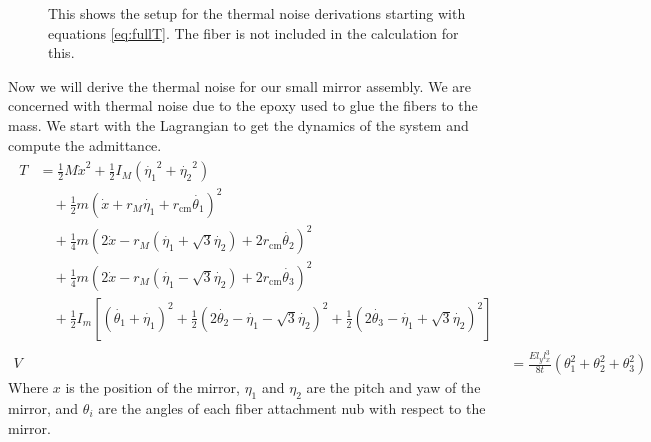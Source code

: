 \begin{figure}
\centering
  \caption[Sketch of Thermal Noise Calculation]{
    This shows the setup for the thermal noise derivations starting with
    equations \ref{eq:fullT}.
    The fiber is not included in the calculation for this.
    }
  \label{fig:tnoisesketch}
\end{figure}

Now we will derive the thermal noise for our small mirror assembly. We are
concerned with thermal noise due to the epoxy used to glue the fibers to the
mass. We start with the Lagrangian to get the dynamics of the system and
compute the admittance.
\begin{align}
\begin{split} \label{eq:fullT}
T &= \frac{1}{2} M \dot{x}^2 +
    \frac{1}{2}I_M \left( \dot{\eta_1}^2 + \dot{\eta_2}^2 \right) \\
    &\quad + \frac{1}{2} m \left(
    \dot{x} + r_M \dot{\eta_1}
    + r_{\mathrm{cm}} \dot{\theta_1} \right)^2 \\
    &\quad + \frac{1}{4} m \left(
    2 \dot{x} - r_M \left(
    \dot{\eta_1}
    + \sqrt{3} \dot{\eta_2} \right)
    + 2r_{\mathrm{cm}} \dot{\theta_2} \right)^2 \\
    &\quad + \frac{1}{4} m \left(
    2 \dot{x} - r_M \left(
    \dot{\eta_1}
    - \sqrt{3} \dot{\eta_2} \right)
    + 2r_{\mathrm{cm}} \dot{\theta_3} \right)^2 \\
    &\quad + \frac{1}{2} I_m \left[
    \left( \dot{\theta_1} + \dot{\eta_1} \right)^2
    + \frac{1}{2} \left( 2\dot{\theta_2} - \dot{\eta_1} - \sqrt{3} \dot{\eta_2} \right)^2
    + \frac{1}{2} \left( 2\dot{\theta_3} - \dot{\eta_1} + \sqrt{3} \dot{\eta_2} \right)^2
    \right]
\end{split} \\
\label{eq:fullV}
V &= \frac{E l_y l_x^3}{8t} \left( \theta_1^2 + \theta_2^2 + \theta_3^2 \right)
\end{align}
Where $x$ is the position of the mirror, $\eta_1$ and $\eta_2$ are the pitch and yaw
of the mirror, and $\theta_i$ are the angles of each fiber attachment nub with
respect to the mirror.

